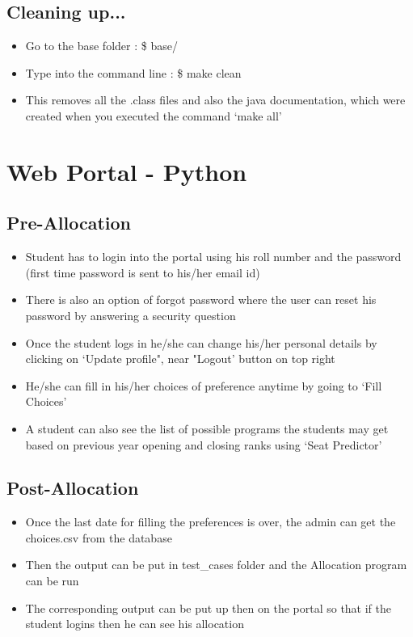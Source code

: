 \documentclass[]{report}
\begin{document}
\subsection{Cleaning up...}
\begin{itemize}
\item Go to the base folder : \$ base/
\item Type into the command line : \$ make clean
\item This removes all the .class files and also the java documentation, which were created when you executed the command `make all'
\end{itemize}

\section{Web Portal - Python}
\subsection{Pre-Allocation}
\begin{itemize}
\item Student has to login into the portal using his roll number and the password (first time password is sent to his/her email id)
\item There is also an option of forgot password where the user can reset his password by answering a security question
\item Once the student logs in he/she can change his/her personal details by clicking on `Update profile", near "Logout' button on top right
\item He/she can fill in his/her choices of preference anytime by going to `Fill Choices'
\item A student can also see the list of possible programs the students may get based on previous year opening and closing ranks using `Seat Predictor'
\end{itemize}

\subsection{Post-Allocation}
\begin{itemize}
\item Once the last date for filling the preferences is over, the admin can get the choices.csv from the database
\item Then the output can be put in test\_cases folder and the Allocation program can be run
\item The corresponding output can be put up then on the portal so that if the student logins then he can see his allocation
\end{itemize}
\end{document}

